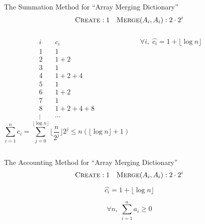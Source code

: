 \begin{frame}{}
  \begin{exampleblock}{The Summation Method for ``Array Merging Dictionary''}
    \[
      \textsc{Create}: 1 \quad \textsc{Merge$(A_i, A_i)$}: 2 \cdot 2^i
    \]
  \end{exampleblock}

  \begin{columns}
      \pause
      \begin{align*}
	i & \quad c_i \\
	1 & \quad 1  \\
	2 & \quad 1 + 2 \\
	3 & \quad 1 \\
	4 & \quad 1 + 2 + 4 \\
	5 & \quad 1 \\
	6 & \quad 1 + 2 \\
	7 & \quad 1 \\
	8 & \quad 1 + 2 + 4 + 8 \\
	\vdots & \quad \cdots
      \end{align*}
      \pause
      \[
	\sum_{i=1}^{n} c_i = \sum_{j=0}^{\lfloor \log n \rfloor} \lfloor \frac{n}{2^j} \rfloor 2^j \le n (\lfloor \log n \rfloor + 1)
      \]

      \pause
      \[
	\forall i,\; \hat{c_i} = 1 + \lfloor \log n \rfloor
      \]
  \end{columns}
\end{frame}

\begin{frame}{}
  \begin{exampleblock}{The Accounting Method for ``Array Merging Dictionary''}
    \[
      \textsc{Create}: 1 \quad \textsc{Merge$(A_i, A_i)$}: 2 \cdot 2^i
    \]
  \end{exampleblock}

  \pause
  \[
    \hat{c_i} = 1 + \lfloor \log n \rfloor
  \]

  \pause

  \pause
  \[
    \forall n,\; \sum_{i=1}^{n} a_i \geq 0
  \]
\end{frame}

